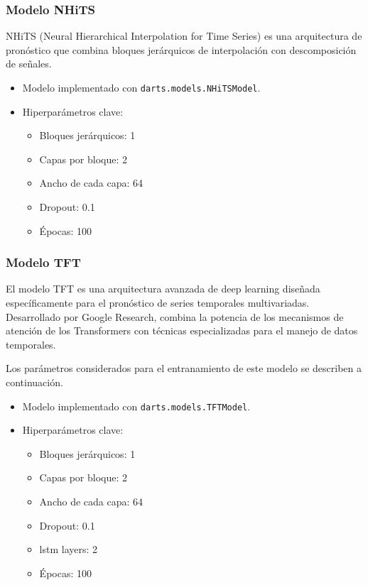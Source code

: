 \documentclass[12pt]{article}
\begin{document}
\subsubsection{Modelo NHiTS}

NHiTS (Neural Hierarchical Interpolation for Time Series) es una arquitectura de pronóstico que combina bloques jerárquicos de interpolación con descomposición de señales.

\begin{itemize}
\item Modelo implementado con \texttt{darts.models.NHiTSModel}.
\item Hiperparámetros clave:
\begin{itemize}
\item Bloques jerárquicos: 1
\item Capas por bloque: 2
\item Ancho de cada capa: 64
\item Dropout: 0.1
\item Épocas: 100
\end{itemize}
\end{itemize}

\subsubsection{Modelo TFT}
El modelo TFT es una arquitectura avanzada de deep learning diseñada específicamente para el pronóstico de series temporales multivariadas. Desarrollado por Google Research, combina la potencia de los mecanismos de atención de los Transformers con técnicas especializadas para el manejo de datos temporales.

Los parámetros considerados para el entranamiento de este modelo se describen a continuación.

\begin{itemize}
\item Modelo implementado con \texttt{darts.models.TFTModel}.
\item Hiperparámetros clave:
\begin{itemize}
\item Bloques jerárquicos: 1
\item Capas por bloque: 2
\item Ancho de cada capa: 64
\item Dropout: 0.1
\item lstm layers: 2
\item Épocas: 100
\end{itemize}
\end{itemize}
\end{document}

